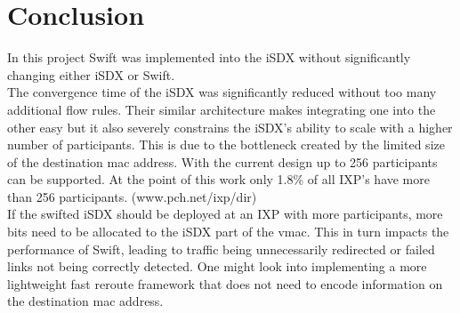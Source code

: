 \chapter{\label{chapter6}Conclusion}
In this project Swift was implemented into the iSDX without significantly changing either iSDX or Swift. \\
The convergence time of the iSDX was significantly reduced without too many additional flow rules. Their similar architecture makes integrating one into the other easy but it also severely constrains the iSDX's ability to scale with a higher number of participants. This is due to the bottleneck created by the limited size of the destination mac address. With the current design up to 256 participants can be supported. At the point of this work only 1.8\% of all IXP's have more than 256 participants. (www.pch.net/ixp/dir) \\
If the swifted iSDX should be deployed at an IXP with more participants, more bits need to be allocated to the iSDX part of the vmac. This in turn impacts the performance of Swift, leading to traffic being unnecessarily redirected or failed links not being correctly detected. One might look into implementing a more lightweight fast reroute framework that does not need to encode information on the destination mac address.
